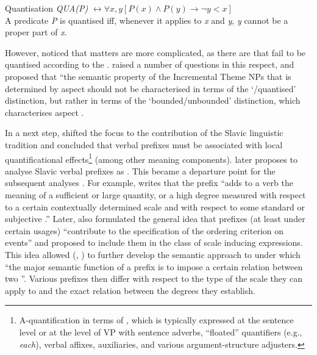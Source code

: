 \theoremstyle{definition}
\begin{definition}{Quantisation}\label{def:quant}
\textit{QUA(P)} $\leftrightarrow \forall x,y[P(x) \wedge P(y) \rightarrow \neg y<x]$\\
A predicate \textit{P} is quantised iff, whenever it applies to \textit{x} and \textit{y}, \textit{y} cannot be a proper part of \textit{x}.
\end{definition}

However, \citet{Filip:92} noticed that matters are more complicated, as there are  that fail to be quantised according to the . \citet{Filip:92} raised a number of questions in this respect, and proposed that ``the semantic property of the Incremental Theme NPs that is determined by aspect should not be characterised in terms of the `/quantised' distinction, but rather in terms of the `bounded/unbounded' distinction, which characterises aspect \citep[][147]{Filip:92}.

In a next step, \citet{Filip:92} shifted the focus to the contribution of the Slavic linguistic tradition \citep{Wierzbicka:67, Rassudova:75, Merrill:85} and concluded that verbal prefixes must be associated with local quantificational effects\footnote{A-quantification in terms of \citealt{BachPartee:87, BachPartee:95}, which is typically expressed at the sentence level or at the level of VP with sentence adverbs, ``floated'' quantifiers (e.g., \textit{each}), verbal affixes, auxiliaries, and various argument-structure adjusters.} (among other meaning components). \citet{Filip:99} later proposes to analyse Slavic verbal prefixes as . This became a departure point for the subsequent analyses \citep{Filip:00, Filip:03, Filip:05, FilipRothstein:05, Kagan:11, Kagan:12, Kagan:13, Kagan:book}. For example, \citet[183]{Filip:99} writes that the prefix  ``adds to a verb the meaning of a sufficient or large quantity, or a high degree measured with respect to a certain contextually determined scale and with respect to some standard or subjective .'' Later, \citet{Filip:08} also formulated the general idea that prefixes (at least under certain usages) ``contribute to the specification of the ordering criterion on events'' and proposed to include them in the class of scale inducing expressions. This idea allowed \citeauthor{Kagan:12} (\citeyear{Kagan:12}, \citeyear{Kagan:book}) to further develop the semantic approach to  under which ``the major semantic function of a prefix is to impose a certain relation between two ''. Various prefixes then differ with respect to the type of the scale they can apply to and the exact relation between the degrees  they establish. 

